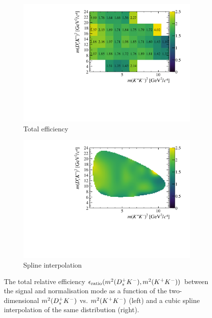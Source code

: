 \begin{figure}[!h]
   \centering
   \begin{subfigure}[t]{0.4\textwidth}
      \includegraphics[width=1.0\textwidth]{figs/B2DsKK/Full_Eff_Hist_All.pdf}
      \caption{Total efficiency}
      \label{fig:B2DsKK_eff_total_hist}
   \end{subfigure}
   \begin{subfigure}[t]{0.4\textwidth}
      \includegraphics[width=1.0\textwidth]{figs/B2DsKK/Full_Eff_Spline_All_withLimit.pdf}
      \caption{Spline interpolation}
      \label{fig:B2DsKK_eff_total_spline}
   \end{subfigure}
   \caption{The total relative efficiency $\epsilon_{\text{ratio}}(m^{2}({{D}^+_{s}}{{K}^-}),m^{2}({{K}^+}{{K}^-}))$ between the signal and normalisation mode as a function of the two-dimensional $m^{2}({{D}^+_{s}}{{K}^-})$ vs. $m^{2}({{K}^+}{{K}^-})$ (left) and a cubic spline interpolation of the same distribution (right).}
   \label{fig:B2DsKK_total_eff}
\end{figure}


